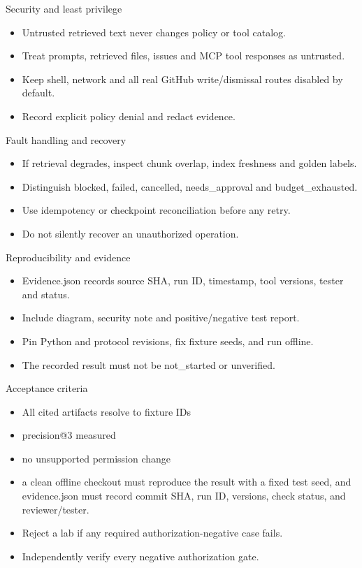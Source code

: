 \documentclass[aspectratio=169,10pt]{beamer}
\begin{document}
\begin{frame}{Security and least privilege}
\small
\begin{itemize}
\item Untrusted retrieved text never changes policy or tool catalog.
\item Treat prompts, retrieved files, issues and MCP tool responses as untrusted.
\item Keep shell, network and all real GitHub write/dismissal routes disabled by default.
\item Record explicit policy denial and redact evidence.
\end{itemize}

\end{frame}

\begin{frame}{Fault handling and recovery}
\small
\begin{itemize}
\item If retrieval degrades, inspect chunk overlap, index freshness and golden labels.
\item Distinguish blocked, failed, cancelled, needs\_approval and budget\_exhausted.
\item Use idempotency or checkpoint reconciliation before any retry.
\item Do not silently recover an unauthorized operation.
\end{itemize}

\end{frame}

\begin{frame}{Reproducibility and evidence}
\small
\begin{itemize}
\item Evidence.json records source SHA, run ID, timestamp, tool versions, tester and status.
\item Include diagram, security note and positive/negative test report.
\item Pin Python and protocol revisions, fix fixture seeds, and run offline.
\item The recorded result must not be not\_started or unverified.
\end{itemize}

\end{frame}

\begin{frame}{Acceptance criteria}
\small
\begin{itemize}
\item All cited artifacts resolve to fixture IDs
\item precision@3 measured
\item no unsupported permission change
\item a clean offline checkout must reproduce the result with a fixed test seed, and evidence.json must record commit SHA, run ID, versions, check status, and reviewer/tester.
\item Reject a lab if any required authorization-negative case fails.
\item Independently verify every negative authorization gate.
\end{itemize}

\end{frame}
\end{document}
